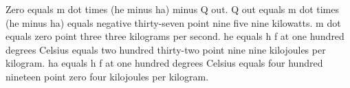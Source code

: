 Zero equals m dot times (he minus ha) minus Q out.  
Q out equals m dot times (he minus ha) equals negative thirty-seven point nine five nine kilowatts.  
m dot equals zero point three three kilograms per second.  
he equals h f at one hundred degrees Celsius equals two hundred thirty-two point nine nine kilojoules per kilogram.  
ha equals h f at one hundred degrees Celsius equals four hundred nineteen point zero four kilojoules per kilogram.